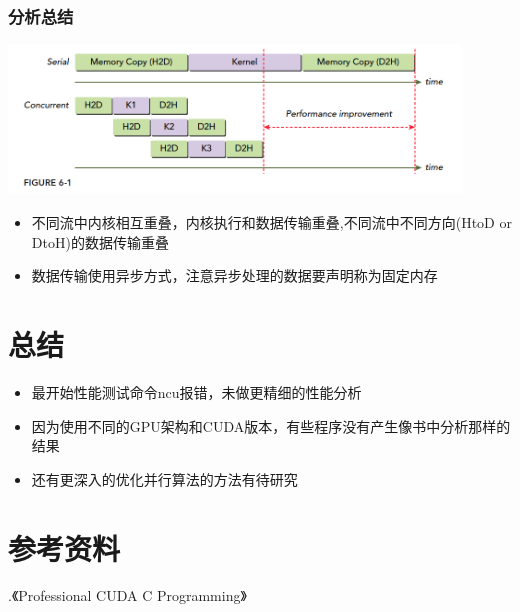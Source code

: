\subsubsection{分析总结}
\noindent
\includegraphics[width=0.9\textwidth]{assets/overlap2.png}
\begin{itemize}
	\item 不同流中内核相互重叠，内核执行和数据传输重叠,不同流中不同方向(HtoD or DtoH)的数据传输重叠
	\item 数据传输使用异步方式，注意异步处理的数据要声明称为固定内存
\end{itemize}

\section{总结}
\begin{itemize}
	\item 最开始性能测试命令ncu报错，未做更精细的性能分析
	\item 因为使用不同的GPU架构和CUDA版本，有些程序没有产生像书中分析那样的结果
	\item 还有更深入的优化并行算法的方法有待研究
\end{itemize}
\section{参考资料}
.《Professional CUDA C Programming》 
